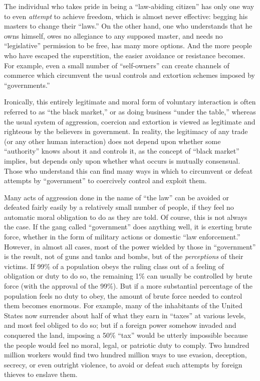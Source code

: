 \documentclass{book}
\begin{document}
The individual who takes pride in being a \enquote{law-abiding citizen} has only one way to even \emph{attempt} to achieve freedom, which is almost never effective: begging his masters to change their \enquote{laws.} On the other hand, one who understands that he owns himself, owes no allegiance to any supposed master, and needs no \enquote{legislative} permission to be free, has many more options. And the more people who have escaped the superstition, the easier avoidance or resistance becomes. For example, even a small number of \enquote{self-owners} can create channels of commerce which circumvent the usual controls and extortion schemes imposed by \enquote{governments.}

Ironically, this entirely legitimate and moral form of voluntary interaction is often referred to as \enquote{the black market,} or as doing business \enquote{under the table,} whereas the usual system of aggression, coercion and extortion is viewed as legitimate and righteous by the believers in government. In reality, the legitimacy of any trade (or any other human interaction) does not depend upon whether some \enquote{authority} knows about it and controls it, as the concept of \enquote{black market} implies, but depends only upon whether what occurs is mutually consensual. Those who understand this can find many ways in which to circumvent or defeat attempts by \enquote{government} to coercively control and exploit them.

Many acts of aggression done in the name of \enquote{the law} can be avoided or defeated fairly easily by a relatively small number of people, if they feel no automatic moral obligation to do as they are told. Of course, this is not always the case. If the gang called \enquote{government} does anything well, it is exerting brute force, whether in the form of military actions or domestic \enquote{law enforcement.} However, in almost all cases, most of the power wielded by those in \enquote{government} is the result, not of guns and tanks and bombs, but of the \emph{perceptions} of their victims. If 99\% of a population obeys the ruling class out of a feeling of obligation or duty to do so, the remaining 1\% can usually be controlled by brute force (with the approval of the 99\%). But if a more substantial percentage of the population feels no duty to obey, the amount of brute force needed to control them becomes enormous. For example, many of the inhabitants of the United States now surrender about half of what they earn in \enquote{taxes} at various levels, and most feel obliged to do so; but if a foreign power somehow invaded and conquered the land, imposing a 50\% \enquote{tax} would be utterly impossible because the people would feel no moral, legal, or patriotic duty to comply. Two hundred million workers would find two hundred million ways to use evasion, deception, secrecy, or even outright violence, to avoid or defeat such attempts by foreign thieves to enslave them.
\end{document}
